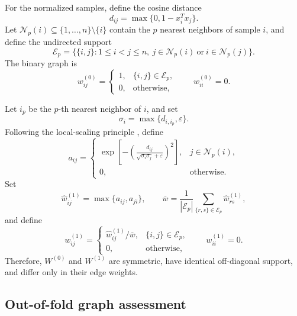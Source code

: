 \documentclass[11pt]{article}
\theoremstyle{remark}
\newcommand{\eps}{\varepsilon}
\begin{document}
For the normalized samples, define the cosine distance
\begin{equation}
\label{eq:distance}
d_{ij}=\max\{0,1-x_i^{T}x_j\}.
\end{equation}
Let $\mathcal N_p(i)\subseteq\{1,\ldots,n\}\setminus\{i\}$ contain the $p$ nearest neighbors of sample $i$, and define the undirected support
\[
\mathcal E_p=\bigl\{\{i,j\}:1\le i<j\le n,\ j\in\mathcal N_p(i)\ \text{or}\ i\in\mathcal N_p(j)\bigr\}.
\]
The binary graph is
\begin{equation}
\label{eq:binary_graph}
w_{ij}^{(0)}=
\begin{cases}
1,&\{i,j\}\in\mathcal E_p,\\
0,&\text{otherwise},
\end{cases}
\qquad
w_{ii}^{(0)}=0.
\end{equation}

Let $i_p$ be the $p$-th nearest neighbor of $i$, and set
\begin{equation}
\label{eq:local_scale}
\sigma_i=\max\{d_{i,i_p},\eps\}.
\end{equation}
Following the local-scaling principle \cite{Zelnik2004SelfTuning}, define
\begin{equation}
\label{eq:directed_local_graph}
a_{ij}=
\begin{cases}
\displaystyle
\exp\!\left[-\left(
\frac{d_{ij}}{\sqrt{\sigma_i\sigma_j}+\eps}
\right)^2\right],&j\in\mathcal N_p(i),\\[2mm]
0,&\text{otherwise}.
\end{cases}
\end{equation}
Set
\[
\widehat w_{ij}^{(1)}=\max\{a_{ij},a_{ji}\},
\qquad
\overline w=\frac{1}{|\mathcal E_p|}\sum_{\{r,s\}\in\mathcal E_p}\widehat w_{rs}^{(1)},
\]
and define
\begin{equation}
\label{eq:local_graph}
w_{ij}^{(1)}=
\begin{cases}
\widehat w_{ij}^{(1)}/\overline w,&\{i,j\}\in\mathcal E_p,\\
0,&\text{otherwise},
\end{cases}
\qquad
w_{ii}^{(1)}=0.
\end{equation}
Therefore, $W^{(0)}$ and $W^{(1)}$ are symmetric, have identical off-diagonal support, and differ only in their edge weights.

\subsection{Out-of-fold graph assessment}
\end{document}

